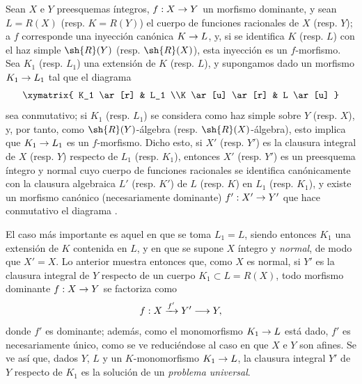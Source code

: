 \documentclass[oneside,10pt]{amsart}
\makeatletter
\newcommand{\ega@arrow}[2]{\mathchoice{#1}{#2}{#2}{#2}}
\renewcommand{\to}{\ega@arrow{\longrightarrow}{\rightarrow}}
\newcommand{\oldpage}[2][]{\marginnote{\normalfont\footnotesize\textbf{#1}~|~#2}\ignorespaces}
\let\EGAOriginalLabel\label
\renewcommand{\label}[1]{\phantomsection\EGAOriginalLabel{#1}}
\makeatother
\begin{document}
\begin{env}[6.3.9]
\label{II.6.3.9}
Sean $X$ e $Y$ preesquemas íntegros, $f:X\to Y$ un morfismo dominante, y sean $L=R(X)$ (resp. $K=R(Y)$) el cuerpo de funciones racionales de $X$ (resp. $Y$);
a $f$ corresponde una inyección canónica $K\to L$, y, si se identifica $K$ (resp. $L$) con el haz simple $\sh{R}(Y)$ (resp. $\sh{R}(X)$), esta inyección es un $f$-morfismo.
Sea $K_1$ (resp. $L_1$) una extensión de $K$ (resp. $L$), y supongamos dado un morfismo $K_1\to L_1$ tal que el diagrama
\[
  \xymatrix{
    K_1 \ar[r]
    & L_1
  \\K \ar[u] \ar[r]
    & L \ar[u]
  }
\]
sea conmutativo;
si $K_1$ (resp. $L_1$) se considera como haz simple sobre $Y$ (resp. $X$), y, por tanto, como $\sh{R}(Y)$-álgebra (resp. $\sh{R}(X)$-álgebra), esto implica que $K_1\to L_1$ es un $f$-morfismo.
Dicho esto, si $X'$ (resp. $Y'$) es la clausura integral de $X$ (resp. $Y$) respecto de $L_1$ (resp. $K_1$), entonces $X'$ (resp. $Y'$) es un preesquema íntegro y normal  cuyo cuerpo de funciones racionales se identifica canónicamente con la clausura algebraica $L'$ (resp. $K'$) de $L$ (resp. $K$) en $L_1$ (resp. $K_1$), y existe un morfismo canónico (necesariamente dominante) $f':X'\to Y'$ que hace conmutativo el diagrama .
\oldpage[II]{120}

El caso más importante es aquel en que se toma $L_1=L$, siendo entonces $K_1$ una extensión de $K$ contenida en $L$, y en que se supone $X$ íntegro y \emph{normal}, de modo que $X'=X$.
Lo anterior muestra entonces que, como $X$ es normal, si $Y'$ es la clausura integral de $Y$ respecto de un cuerpo $K_1\subset L=R(X)$, todo morfismo dominante $f:X\to Y$ se factoriza como
\[
  f:X\xrightarrow{f'}Y'\to Y,
\]
donde $f'$ es dominante;
además, como el monomorfismo $K_1\to L$ está dado, $f'$ es necesariamente único, como se ve reduciéndose al caso en que $X$ e $Y$ son afines.
Se ve así que, dados $Y$, $L$ y un $K$-monomorfismo $K_1\to L$, la clausura integral $Y'$ de $Y$ respecto de $K_1$ es la solución de un \emph{problema universal}.
\end{env}
\end{document}

